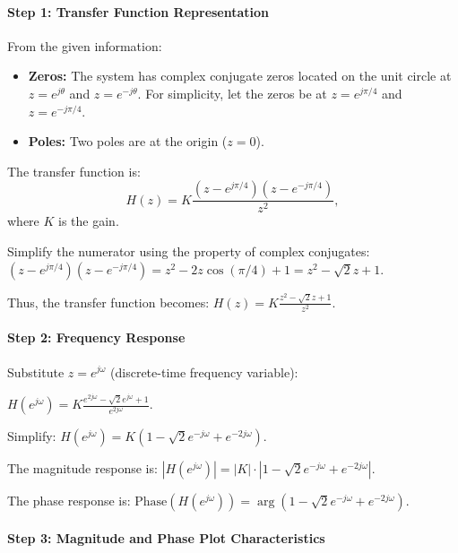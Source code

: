 \documentclass[11pt]{article}
\begin{document}
\paragraph{Step 1: Transfer Function
Representation}\label{step-1-transfer-function-representation}

From the given information:

\begin{itemize}
\item
  \textbf{Zeros:} The system has complex conjugate zeros located on the
  unit circle at \(z = e^{j\theta}\) and \(z = e^{-j\theta}\). For
  simplicity, let the zeros be at \(z = e^{j\pi/4}\) and
  \(z = e^{-j\pi/4}\).
\item
  \textbf{Poles:} Two poles are at the origin (\(z = 0\)).
\end{itemize}

The transfer function is: \[
H(z) = K \frac{(z - e^{j\pi/4})(z - e^{-j\pi/4})}{z^2},
\] where \(K\) is the gain.

Simplify the numerator using the property of complex conjugates:
\((z - e^{j\pi/4})(z - e^{-j\pi/4}) = z^2 - 2z\cos(\pi/4) + 1 = z^2 - \sqrt{2}z + 1.\)

Thus, the transfer function becomes:
\(H(z) = K \frac{z^2 - \sqrt{2}z + 1}{z^2}.\)

\paragraph{Step 2: Frequency Response}\label{step-2-frequency-response}

Substitute \(z = e^{j\omega}\) (discrete-time frequency variable):

\(H(e^{j\omega}) = K \frac{e^{2j\omega} - \sqrt{2}e^{j\omega} + 1}{e^{2j\omega}}.\)

Simplify:
\(H(e^{j\omega}) = K \left( 1 - \sqrt{2}e^{-j\omega} + e^{-2j\omega} \right).\)

The magnitude response is:
\(|H(e^{j\omega})| = |K| \cdot \left| 1 - \sqrt{2}e^{-j\omega} + e^{-2j\omega} \right|.\)

The phase response is:
\(\text{Phase}(H(e^{j\omega})) = \arg\left( 1 - \sqrt{2}e^{-j\omega} + e^{-2j\omega} \right).\)

\paragraph{Step 3: Magnitude and Phase Plot
Characteristics}\label{step-3-magnitude-and-phase-plot-characteristics}
\end{document}
